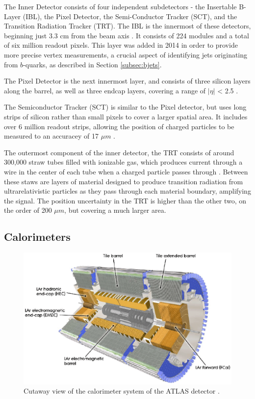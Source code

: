 The Inner Detector consists of four independent subdetectors - the Insertable B-Layer (IBL), the Pixel Detector, the Semi-Conductor Tracker (SCT), and the Transition Radiation Tracker (TRT). The IBL is the innermost of these detectors, beginning just 3.3 cm from the beam axis \cite{larosa2016atlas}. It consists of 224 modules and a total of six million readout pixels. This layer was added in 2014 in order to provide more precise vertex measurements, a crucial aspect of identifying jets originating from $b$-quarks, as described in Section \ref{subsec:bjets}. 

The Pixel Detector is the next innermost layer, and consists of three silicon layers along the barrel, as well as three endcap layers, covering a range of $|\eta|$ < 2.5 \cite{PERF-2012-05}. 

The Semiconductor Tracker (SCT) is similar to the Pixel detector, but uses long strips of silicon rather than small pixels to cover a larger spatial area. It includes over 6 million readout strips, allowing the position of charged particles to be measured to an accuracey of 17 $\mu m$ \cite{IDET-2013-01}.

The outermost component of the inner detector, the TRT consists of around 300,000 straw tubes filled with ionizable gas, which produces current through a wire in the center of each tube when a charged particle passes through \cite{IDET-2015-01}. Between these staws are layers of material designed to produce transition radiation from ultrarelativistic particles as they pass through each material boundary, amplifying the signal. The position uncertainty in the TRT is higher than the other two, on the order of 200 $\mu m$, but covering a much larger area.

\subsection{Calorimeters}
\label{sec:calo}

\begin{figure}[H]
\centering
   \includegraphics[width=0.9\linewidth]{figures/lhc/calorimeter.eps}
\caption{Cutaway view of the calorimeter system of the ATLAS detector \cite{caloFig}.}
\label{fig:calo}
\end{figure}

